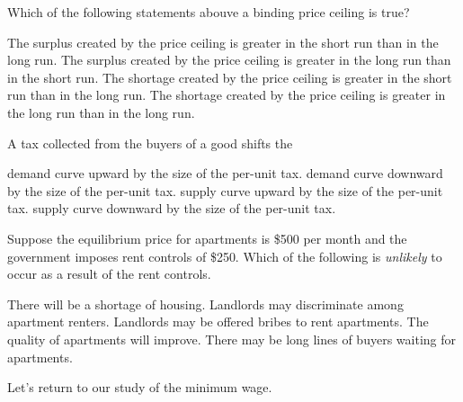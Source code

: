 \documentclass[addpoints,11pt]{exam}
\theoremstyle{definition}
\begin{document}
\begin{questions}
\question Which of the following statements abouve a binding price ceiling is true?

\begin{choices}
	\choice The surplus created by the price ceiling is greater in the short run than in the long run.
	\choice The surplus created by the price ceiling is greater in the long run than in the short run.
	\choice The shortage created by the price ceiling is greater in the short run than in the long run.
	\CorrectChoice The shortage created by the price ceiling is greater in the long run than in the long run.
\end{choices}


\question A tax collected from the buyers of a good shifts the 

\begin{choices}
	\choice demand curve upward by the size of the per-unit tax.
	\CorrectChoice demand curve downward by the size of the per-unit tax.
	\choice supply curve upward by the size of the per-unit tax.
	\choice supply curve downward by the size of the per-unit tax.
\end{choices}

\question Suppose the equilibrium price for apartments is \$500 per month and the government imposes rent controls of \$250. Which of the following is \textit{unlikely} to occur as a result of the rent controls.

\begin{choices}
	\choice There will be a shortage of housing.
	\choice Landlords may discriminate among apartment renters.
	\choice Landlords may be offered bribes to rent apartments.
	\CorrectChoice The quality of apartments will improve.
	\choice There may be long lines of buyers waiting for apartments.
\end{choices}
	
	\question Let's return to our study of the minimum wage.
	
\end{questions}
\end{document}
